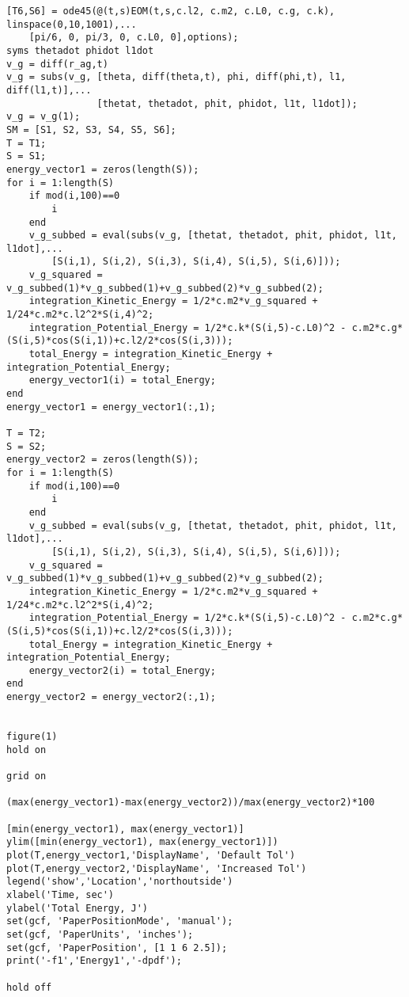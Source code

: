 \begin{lstlisting}[frame=lines,style=Matlab-editor,basicstyle = \mlttfamily]
%-------------------------------------------------------------------------%
[T6,S6] = ode45(@(t,s)EOM(t,s,c.l2, c.m2, c.L0, c.g, c.k), linspace(0,10,1001),...
    [pi/6, 0, pi/3, 0, c.L0, 0],options);
syms thetadot phidot l1dot
v_g = diff(r_ag,t)
v_g = subs(v_g, [theta, diff(theta,t), phi, diff(phi,t), l1, diff(l1,t)],...
                [thetat, thetadot, phit, phidot, l1t, l1dot]);
v_g = v_g(1);
SM = [S1, S2, S3, S4, S5, S6];
T = T1;
S = S1;
energy_vector1 = zeros(length(S));
for i = 1:length(S)
    if mod(i,100)==0
        i
    end
    v_g_subbed = eval(subs(v_g, [thetat, thetadot, phit, phidot, l1t, l1dot],...
        [S(i,1), S(i,2), S(i,3), S(i,4), S(i,5), S(i,6)]));
    v_g_squared = v_g_subbed(1)*v_g_subbed(1)+v_g_subbed(2)*v_g_subbed(2);
    integration_Kinetic_Energy = 1/2*c.m2*v_g_squared + 1/24*c.m2*c.l2^2*S(i,4)^2;
    integration_Potential_Energy = 1/2*c.k*(S(i,5)-c.L0)^2 - c.m2*c.g*(S(i,5)*cos(S(i,1))+c.l2/2*cos(S(i,3)));
    total_Energy = integration_Kinetic_Energy + integration_Potential_Energy;
    energy_vector1(i) = total_Energy;
end
energy_vector1 = energy_vector1(:,1);

T = T2;
S = S2;
energy_vector2 = zeros(length(S));
for i = 1:length(S)
    if mod(i,100)==0
        i
    end
    v_g_subbed = eval(subs(v_g, [thetat, thetadot, phit, phidot, l1t, l1dot],...
        [S(i,1), S(i,2), S(i,3), S(i,4), S(i,5), S(i,6)]));
    v_g_squared = v_g_subbed(1)*v_g_subbed(1)+v_g_subbed(2)*v_g_subbed(2);
    integration_Kinetic_Energy = 1/2*c.m2*v_g_squared + 1/24*c.m2*c.l2^2*S(i,4)^2;
    integration_Potential_Energy = 1/2*c.k*(S(i,5)-c.L0)^2 - c.m2*c.g*(S(i,5)*cos(S(i,1))+c.l2/2*cos(S(i,3)));
    total_Energy = integration_Kinetic_Energy + integration_Potential_Energy;
    energy_vector2(i) = total_Energy;
end
energy_vector2 = energy_vector2(:,1);


figure(1)
hold on

grid on

(max(energy_vector1)-max(energy_vector2))/max(energy_vector2)*100

[min(energy_vector1), max(energy_vector1)]
ylim([min(energy_vector1), max(energy_vector1)])
plot(T,energy_vector1,'DisplayName', 'Default Tol')
plot(T,energy_vector2,'DisplayName', 'Increased Tol')
legend('show','Location','northoutside')
xlabel('Time, sec')
ylabel('Total Energy, J')
set(gcf, 'PaperPositionMode', 'manual');
set(gcf, 'PaperUnits', 'inches');
set(gcf, 'PaperPosition', [1 1 6 2.5]);
print('-f1','Energy1','-dpdf');

hold off


\end{lstlisting}
